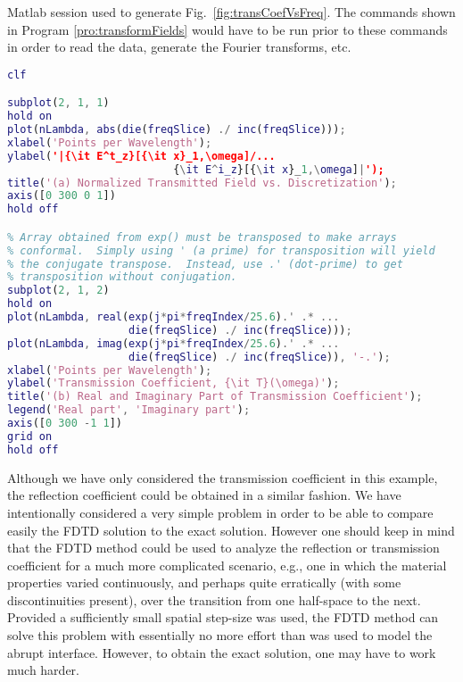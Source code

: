 \begin{program}
Matlab session used to generate Fig.\
\ref{fig:transCoefVsFreq}.  The commands shown in Program
\ref{pro:transformFields} would have to be run prior to these
commands in order to read the data, generate the Fourier transforms, etc.
 \label{pro:transCoefficient}
\codemiddle
\begin{lstlisting}[language=Matlab]
clf

subplot(2, 1, 1)
hold on
plot(nLambda, abs(die(freqSlice) ./ inc(freqSlice)));
xlabel('Points per Wavelength');
ylabel('|{\it E^t_z}[{\it x}_1,\omega]/...
                          {\it E^i_z}[{\it x}_1,\omega]|');
title('(a) Normalized Transmitted Field vs. Discretization');
axis([0 300 0 1])
hold off

% Array obtained from exp() must be transposed to make arrays
% conformal.  Simply using ' (a prime) for transposition will yield
% the conjugate transpose.  Instead, use .' (dot-prime) to get
% transposition without conjugation.
subplot(2, 1, 2)
hold on
plot(nLambda, real(exp(j*pi*freqIndex/25.6).' .* ...
                   die(freqSlice) ./ inc(freqSlice)));
plot(nLambda, imag(exp(j*pi*freqIndex/25.6).' .* ...
                   die(freqSlice) ./ inc(freqSlice)), '-.');
xlabel('Points per Wavelength');
ylabel('Transmission Coefficient, {\it T}(\omega)');
title('(b) Real and Imaginary Part of Transmission Coefficient');
legend('Real part', 'Imaginary part');
axis([0 300 -1 1])
grid on
hold off
\end{lstlisting}
\end{program}

Although we have only considered the transmission coefficient in this
example, the reflection coefficient could be obtained in a similar
fashion.  We have intentionally considered a very simple problem in
order to be able to compare easily the FDTD solution to the exact
solution.  However one should keep in mind that the FDTD method could
be used to analyze the reflection or transmission coefficient for a
much more complicated scenario, e.g., one in which the material
properties varied continuously, and perhaps quite erratically (with
some discontinuities present), over the transition from one half-space
to the next.  Provided a sufficiently small spatial step-size was
used, the FDTD method can solve this problem with essentially no more
effort than was used to model the abrupt interface.  However, to
obtain the exact solution, one may have to work much harder.

